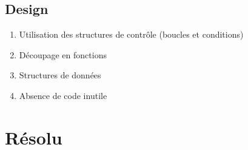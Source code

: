 \documentclass[11pt,french,a4paper,twoside]{scrartcl}
\begin{document}
\subsection{Design}
\begin{enumerate}
	\item Utilisation des structures de contrôle (boucles et conditions)
	\item Découpage en fonctions
	\item Structures de données
	\item Absence de code inutile
\end{enumerate}

\section{Résolu}

\begin{singlespace}
	\inputminted{C}{sources/polygons.c}
\end{singlespace}
\end{document}
